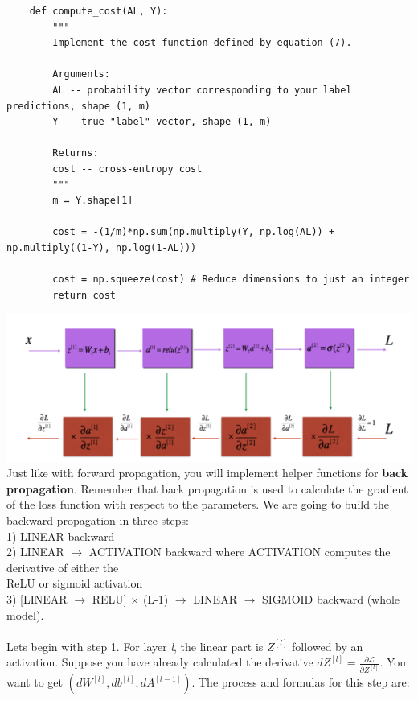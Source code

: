 \documentclass[11pt, a4paper]{article}
\begin{document}
\begin{spacing}{1.1}
	\begin{lstlisting}
	def compute_cost(AL, Y):
		"""
		Implement the cost function defined by equation (7).
		
		Arguments:
		AL -- probability vector corresponding to your label predictions, shape (1, m)
		Y -- true "label" vector, shape (1, m)
		
		Returns:
		cost -- cross-entropy cost
		"""
		m = Y.shape[1]
		
		cost = -(1/m)*np.sum(np.multiply(Y, np.log(AL)) + np.multiply((1-Y), np.log(1-AL)))
		
		cost = np.squeeze(cost) # Reduce dimensions to just an integer		
		return cost \end{lstlisting} \vspace*{1mm}
	\hspace*{30mm} \includegraphics[scale=.6]{deep_back_prop} \vspace*{1mm} \\
	Just like with forward propagation, you will implement helper functions for \textbf{back propagation}. Remember that back propagation is used to calculate the gradient of the loss function with respect to the parameters. We are going to build the backward propagation in three steps: \\
	\hspace*{3mm} 1) LINEAR backward \\
	\hspace*{3mm} 2) LINEAR $\rightarrow$ ACTIVATION backward where ACTIVATION computes the derivative of either the \\ \hspace*{7.5mm} ReLU or sigmoid activation\\
	\hspace*{3mm} 3) [LINEAR $\rightarrow$ RELU] $\times$ (L-1) $\rightarrow$ LINEAR $\rightarrow$ SIGMOID backward (whole model). \\~\\
	Lets begin with step 1. For layer \textit{l}, the linear part is $Z^{[l]}$ followed by an activation. Suppose you have already calculated the derivative $dZ^{[l]} = \frac{\partial \mathcal{L} }{\partial Z^{[l]}}$. You want to get $(dW^{[l]}, db^{[l]}, dA^{[l-1]})$. The process and formulas for this step are: \vspace*{1mm} \\

\end{spacing}
\end{document}
